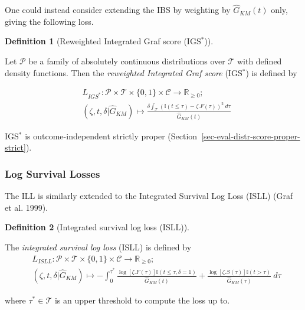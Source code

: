 \documentclass[
  letterpaper,
]{scrbook}
\theoremstyle{plain}
\theoremstyle{definition}
\newtheorem{definition}{Definition}[chapter]
\theoremstyle{remark}
\begin{document}
One could instead consider extending the IBS by weighting by
\(\hat{G}_{KM}(t)\) only, giving the following loss.

\leavevmode{}%
\begin{definition}[Reweighted Integrated Graf score
(IGS\(^*\))]\label{def-rigs}

Let \(\mathcal{P}\) be a family of absolutely continuous distributions
over \(\mathcal{T}\) with defined density functions. Then the
\emph{reweighted Integrated Graf score} (IGS\(^*\)) is defined by

\[\label{eq:wsbs}
\begin{split}
&L_{IGS^*}: \mathcal{P}\times \mathcal{T}\times \{0,1\}\times \mathcal{C}\rightarrow \mathbb{R}_{\geq 0}; \\
&(\zeta, t, \delta|\hat{G}_{KM}) \mapsto \frac{\delta \int_{\mathcal{T}} (\mathbb{I}(t \leq \tau) - \zeta.F(\tau))^2 \ d\tau}{\hat{G}_{KM}(t)}
\end{split}
\]

\end{definition}

IGS\(^*\) is outcome-independent strictly proper
(Section~\ref{sec-eval-distr-score-proper-strict}).

\hypertarget{log-survival-losses}{%
\subsubsection{Log Survival Losses}\label{log-survival-losses}}

The ILL is similarly extended to the Integrated Survival Log Loss (ISLL)
(Graf et al. 1999).

\leavevmode{}%
\begin{definition}[Integrated survival log loss (ISLL)]\label{def-isll}

The \emph{integrated survival log loss} (ISLL) is defined by
\begin{align*}
& L_{ISLL}: \mathcal{P}\times \mathcal{T}\times \{0,1\}\times \mathcal{C}\rightarrow \mathbb{R}_{\geq 0}; \\
& (\zeta,t,\delta|\hat{G}_{KM}) \mapsto -\int^{\tau^*}_0  \frac{\log[\zeta.F(\tau)] \mathbb{I}(t \leq \tau, \delta=1)}{\hat{G}_{KM}(t)} + \frac{\log[\zeta.S(\tau)] \mathbb{I}(t > \tau)}{\hat{G}_{KM}(\tau)} \ d\tau
\label{eq:isll}
\end{align*}

where \(\tau^* \in \mathcal{T}\) is an upper threshold to compute the
loss up to.

\end{definition}
\end{document}
